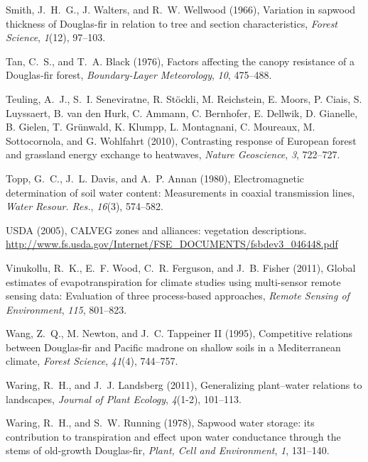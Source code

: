 Smith, J.~H.~G., J. Walters, and R.~W. Wellwood (1966), Variation in sapwood thickness of Douglas-fir in relation to tree and section characteristics, \textit{Forest Science}, \textit{1}(12), 97--103.

Tan, C.~S., and T.~A. Black (1976), Factors affecting the canopy resistance of a Douglas-fir forest, 
\textit{Boundary-Layer Meteorology}, \textit{10}, 475--488.

Teuling, A.~J., S.~I. Seneviratne, R. St\"{o}ckli, M. Reichstein, E. Moors, P. Ciais, S. Luyssaert, B. van den Hurk, C. Ammann, C. Bernhofer, E. Dellwik, D. Gianelle, B. Gielen, T. Gr\"{u}nwald, K. Klumpp, L. Montagnani, C. Moureaux, M. Sottocornola, and G. Wohlfahrt (2010), Contrasting response of European forest and grassland energy exchange to heatwaves, 
\textit{Nature Geoscience}, \textit{3}, 722--727.

Topp, G.~C., J.~L. Davis, and A.~P. Annan (1980), Electromagnetic determination of soil water content: Measurements in coaxial transmission lines, 
\textit{Water Resour. Res.}, \textit{16}(3), 574--582.

USDA (2005), CALVEG zones and alliances: vegetation descriptions.  \url{http://www.fs.usda.gov/Internet/FSE_DOCUMENTS/fsbdev3_046448.pdf}

Vinukollu, R.~K., E.~F. Wood, C.~R. Ferguson, and J.~B. Fisher (2011), Global estimates of evapotranspiration for climate studies using multi-sensor remote sensing data: Evaluation of three process-based approaches,
\textit{Remote Sensing of Environment}, \textit{115}, 801--823.

Wang, Z.~Q., M. Newton, and J.~C. Tappeiner II (1995), Competitive relations between Douglas-fir and Pacific madrone on shallow soils in a Mediterranean climate, 
\textit{Forest Science}, \textit{41}(4), 744--757.

Waring, R.~H., and J.~J. Landsberg (2011), Generalizing plant--water relations to landscapes, 
\textit{Journal of Plant Ecology}, \textit{4}(1-2), 101--113.

Waring, R.~H., and S.~W. Running (1978), Sapwood water storage: its contribution to transpiration and effect upon water conductance through the stems of old-growth Douglas-fir, 
\textit{Plant, Cell and Environment}, \textit{1}, 131--140.

